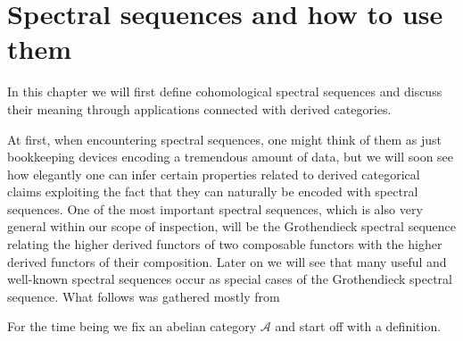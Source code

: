 \section{Spectral sequences and how to use them}

In this chapter we will first define cohomological spectral sequences and discuss their meaning through applications connected with derived categories.

At first, when encountering spectral sequences, one might think of them as just  bookkeeping devices encoding a tremendous amount of data, but we will soon see how elegantly one can infer certain properties related to derived categorical claims exploiting the fact that they can naturally be encoded with spectral sequences.
One of the most important spectral sequences, which is also very general within our scope of inspection, will be the Grothendieck spectral sequence relating the higher derived functors of two composable functors with the higher derived functors of their composition. Later on we will see that many useful and well-known spectral sequences occur as special cases of the Grothendieck spectral sequence. What follows was gathered mostly from \cite{}


For the time being we fix an abelian category $\mathcal A$ and start off with a definition.

